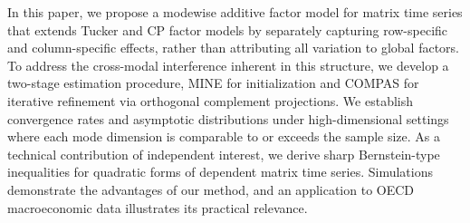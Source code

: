 \documentclass[11pt,letterpaper]{article}
\theoremstyle{definition}
\begin{document}
In this paper, we propose a modewise additive factor model for matrix time series that extends Tucker and CP factor models by separately capturing row-specific and column-specific effects, rather than attributing all variation to global factors. To address the cross-modal interference inherent in this structure, we develop a two-stage estimation procedure, MINE for initialization and COMPAS for iterative refinement via orthogonal complement projections. We establish convergence rates and asymptotic distributions under high-dimensional settings where each mode dimension is comparable to or exceeds the sample size. As a technical contribution of independent interest, we derive sharp Bernstein-type inequalities for quadratic forms of dependent matrix time series. Simulations demonstrate the advantages of our method, and an application to OECD macroeconomic data illustrates its practical relevance.









%
%

% 
% 


\end{document}
